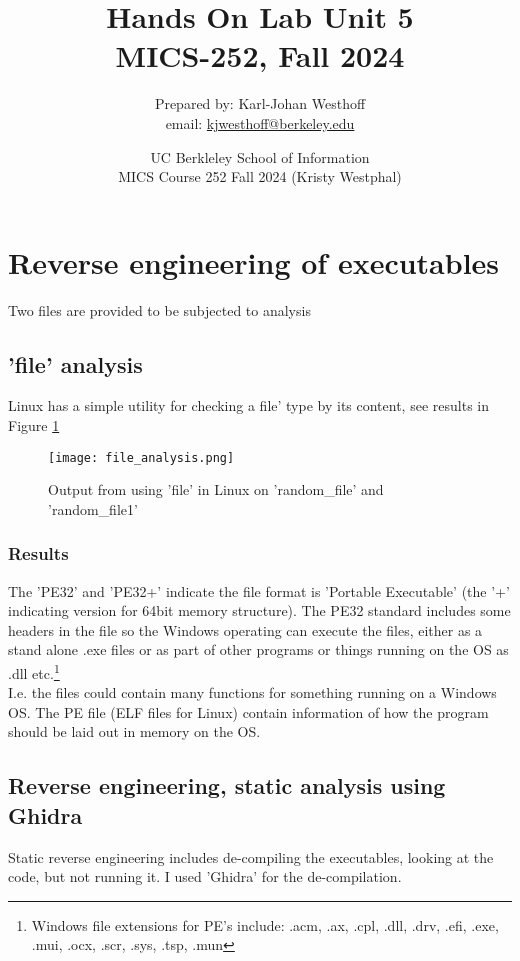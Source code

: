 \documentclass[
	letterpaper, %
	10pt, %
	unnumberedsections, %
	twoside, %
]{APAAssignment}
\title{Hands On Lab Unit 5 \\ MICS-252, Fall 2024} %
\date{UC Berkleley School of Information \\
MICS Course 252 Fall 2024 (Kristy Westphal)
}
\author{
	Prepared by: Karl-Johan Westhoff \\
	email: \href{mailto:kjwesthoff@berkeley.edu}{kjwesthoff@berkeley.edu}
}
\begin{document}
\onecolumn
\maketitle %



\section{Reverse engineering of executables}\label{log-analysis}
Two files are provided to be subjected to analysis

\subsection{'file' analysis}
Linux has a simple utility for checking a file' type by its content, see results in Figure \ref{fig:fileAnalysis}
\begin{figure}[!htp] %
	\centering
	\texttt{[image: file\_analysis.png]}
	\caption{Output from using 'file' in Linux on 'random\_file' and 'random\_file1'}
	\label{fig:fileAnalysis}
\end{figure}

\subsubsection{Results} The 'PE32' and 'PE32+' indicate the file format is 'Portable Executable' (the '+' indicating version for 64bit memory structure)\cite{PE32Wikipedia}. The PE32 standard includes some headers in the file so the Windows operating can execute the files, either as a stand alone .exe files or as part of other programs or things running on the OS as .dll etc.\footnote{Windows file extensions for PE's include: .acm, .ax, .cpl, .dll, .drv, .efi, .exe, .mui, .ocx, .scr, .sys, .tsp, .mun\cite{PE32Wikipedia}} \\
I.e. the files could contain many functions for something running on a Windows OS. The PE file (ELF files for Linux) contain information of how the program should be laid out in memory on the OS.

\subsection{Reverse engineering, static analysis using Ghidra}
Static reverse engineering includes de-compiling the executables, looking at the code, but not running it. I used 'Ghidra'\cite{Ghidra } for the de-compilation. 
\end{document}
